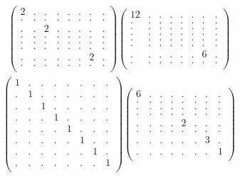\documentclass[12pt,a4paper]{amsart}
\begin{document}
\begin{align*}
\left(\begin{array}{rrrrrrrr}%
2&.&.&.&.&.&.&.\\%
.&.&.&.&.&.&.&.\\%
.&.&2&.&.&.&.&.\\%
.&.&.&.&.&.&.&.\\%
.&.&.&.&.&.&.&.\\%
.&.&.&.&.&.&.&.\\%
.&.&.&.&.&.&2&.\\%
.&.&.&.&.&.&.&.\\%
\end{array}\right)%
\left(\begin{array}{rrrrrrrr}%
12&.&.&.&.&.&.&.\\%
.&.&.&.&.&.&.&.\\%
.&.&.&.&.&.&.&.\\%
.&.&.&.&.&.&.&.\\%
.&.&.&.&.&.&.&.\\%
.&.&.&.&.&.&.&.\\%
.&.&.&.&.&.&6&.\\%
.&.&.&.&.&.&.&.\\%
\end{array}\right)%
\end{align*}
\begin{align*}
\left(\begin{array}{rrrrrrrr}%
1&.&.&.&.&.&.&.\\%
.&1&.&.&.&.&.&.\\%
.&.&1&.&.&.&.&.\\%
.&.&.&1&.&.&.&.\\%
.&.&.&.&1&.&.&.\\%
.&.&.&.&.&1&.&.\\%
.&.&.&.&.&.&1&.\\%
.&.&.&.&.&.&.&1\\%
\end{array}\right)%
\left(\begin{array}{rrrrrrrr}%
6&.&.&.&.&.&.&.\\%
.&.&.&.&.&.&.&.\\%
.&.&.&.&.&.&.&.\\%
.&.&.&.&.&.&.&.\\%
.&.&.&.&2&.&.&.\\%
.&.&.&.&.&.&.&.\\%
.&.&.&.&.&.&3&.\\%
.&.&.&.&.&.&.&1\\%
\end{array}\right)%
\end{align*}
\end{document}

